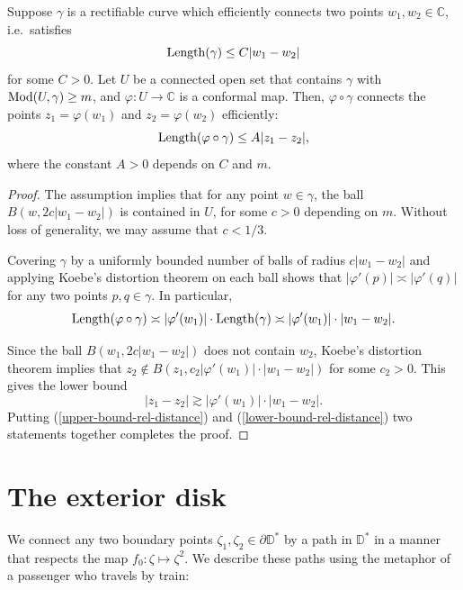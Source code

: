 \begin{lemma}
\label{koebe-quasiconvexity}
Suppose $\gamma$ is a rectifiable curve which efficiently connects two points $w_1, w_2 \in \mathbb{C}$, i.e.~satisfies $$\operatorname{Length}(\gamma) \le C |w_1 - w_2|$$
for some $C > 0$.
Let $U$ be a connected open set that contains $\gamma$ with $\operatorname{Mod}(U, \gamma) \ge m$, and $\varphi: U \to \mathbb{C}$ is a conformal map.
Then, $\varphi \circ \gamma$ connects the points  $z_1 = \varphi(w_1)$ and $z_2 = \varphi(w_2)$ efficiently:
$$
\operatorname{Length}(\varphi \circ \gamma) \le A |z_1 - z_2|,
$$
where the constant $A > 0$ depends on $C$ and $m$.
\end{lemma}

\begin{proof}
The assumption implies that for any point $w \in \gamma$, the ball $B(w, 2c|w_1 - w_2|)$ is contained in $U$, for some $c > 0$ depending on $m$.
Without loss of generality, we may assume that $c < 1/3$. 

Covering $\gamma$ by a uniformly bounded number of balls of radius $c|w_1-w_2|$ and applying Koebe's distortion theorem on each ball shows that
$|\varphi'(p)| \asymp |\varphi'(q)|$ for any two points $p, q \in \gamma$. In particular,
\begin{equation}
\label{upper-bound-rel-distance}
\operatorname{Length}(\varphi \circ \gamma) \asymp |\varphi'(w_1)| \cdot \operatorname{Length}(\gamma) \asymp |\varphi'(w_1)| \cdot |w_1 - w_2|.
\end{equation}

Since the ball $B(w_1, 2c|w_1 - w_2|)$ does not contain $w_2$, Koebe's distortion theorem implies that $z_2 \notin B(z_1, c_2 |\varphi'(w_1)| \cdot |w_1 - w_2|)$ for some $c_2 > 0$. This gives the lower bound
\begin{equation}
\label{lower-bound-rel-distance}
|z_1-z_2| \gtrsim |\varphi'(w_1)| \cdot |w_1 - w_2|.
\end{equation}
Putting (\ref{upper-bound-rel-distance}) and (\ref{lower-bound-rel-distance}) two statements together completes the proof.
\end{proof}

	 
\section{The exterior disk}

We connect any two boundary points $\zeta_1, \zeta_2 \in \partial \mathbb D^*$ by a path in $\mathbb D^*$ in a manner that respects the map 
$f_0: \zeta \mapsto \zeta^2$.
We describe these paths using the metaphor of a passenger who travels by train:

